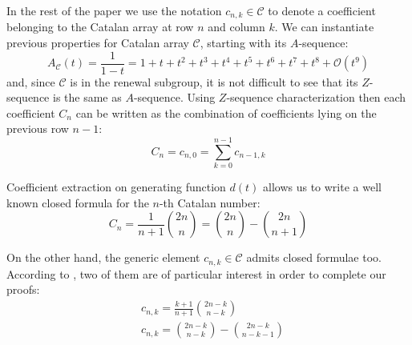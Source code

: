 In the rest of the paper we use the notation $c_{n,k}\in\mathcal{C}$ to denote
a coefficient belonging to the Catalan array at row $n$ and column $k$.
We can instantiate previous properties for Catalan array $\mathcal{C}$, starting with its $A$-sequence:
\begin{displaymath}
    A_{\mathcal{C}}(t)=\frac{1}{1-t}=1+t+t^{2}+t^{3}+t^{4}+t^{5}+t^{6}+t^{7}+t^{8}+
        \mathcal{O}(t^{9})
\end{displaymath}
and, since $\mathcal{C}$ is in the renewal subgroup, it is not difficult to see that its
$Z$-sequence is the same as $A$-sequence. Using $Z$-sequence characterization then 
each coefficient $C_{n}$ can be written as the combination of coefficients 
lying on the previous row $n-1$:
\begin{displaymath}
    C_{n} = c_{n,0} = \sum_{k=0}^{n-1}{c_{n-1,k}}
\end{displaymath}
\iffalse
in other words, $C_{n}$ equals the $(n-1)$-row sum of $\mathcal{C}$, 
therefore by the fundamental theorem:
\begin{displaymath}
    C_{n} = [t^{n-1}]\mathcal{C}\,A_{\mathcal{C}}(t)
          = [t^{n-1}]d(t)\,A_{\mathcal{C}}(h(t))
          = [t^{n}]h(t)\,A_{\mathcal{C}}(h(t))
\end{displaymath}
yielding:
\begin{displaymath}
    C_{n} = [t^{n}]\frac{1-\sqrt{1-4 \, t}}{1+\sqrt{1-4 \, t}}
\end{displaymath}
for $n>0$ and boundary condition $C_{0}=1$. 
Moreover, from the above equation, it is possible to derive
another generating function for the sequence of Catalan numbers:
\begin{displaymath}
    \frac{1-\sqrt{1-4 \, t}}{1+\sqrt{1-4 \, t}}=
    \frac{\left(1-\sqrt{1-4 \, t}\right)^{2}}{4 \, t}=
    \frac{1-2\,t-\sqrt{1-4 \, t}}{2 \, t}
\end{displaymath}
\fi
Coefficient extraction on generating function $d(t)$ allows us to write 
a well known closed formula for the $n$-th Catalan number:
\begin{equation}
    C_{n} = \frac{1}{n+1}{{2n}\choose{n}} 
        = {{2n}\choose{n}} - {{2n}\choose{n+1}}
    \label{eq:catalan:coeff:rewriting}
\end{equation}

On the other hand, the generic element $c_{n,k}\in\mathcal{C}$ 
admits closed formulae too. According to
\cite{luzon:2012631}, two of them are of
particular interest in order to complete our proofs:
\begin{align}
    & c_{n,k}=\frac{k+1}{n+1}{{2n-k}\choose{n-k}}
    \label{eq:catalan:array:first:identity}\\
    & c_{n,k}={{2n-k}\choose{n-k}} - {{2n-k}\choose{n-k-1}}
    \label{eq:catalan:array:second:identity}
\end{align}

